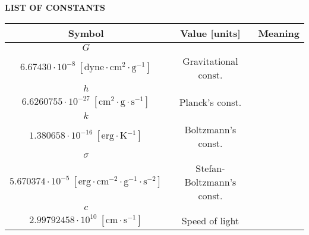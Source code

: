\newpage

{}
\noindent \Large \textbf{LIST OF CONSTANTS}
\normalsize

\vspace{10mm}
\begin{center}

\begingroup
\def\arraystretch{1.5}

\begin{tabularx}{\textwidth}{ccX}
\hline
\hline
\textbf{Symbol}	& \textbf{Value [units]} & \textbf{Meaning} \\
\hline
\hline
$G$	&
	\begin{tabular}{c}
        $6.67430 \cdot 10^{-11}\ [\si{\newton \cdot \meter^2 \cdot \kilogram^{-2}}]$ \\
         $6.67430 \cdot 10^{-8}\ [\si{\mathrm{dyne} \cdot \cm^2 \cdot \gram^{-1}}]$
	\end{tabular} 
	& Gravitational const. \\

$h$ &
	\begin{tabular}{c}
        $6.6260755 \cdot 10^{-34}\ [\si{\meter^2 \cdot \kilogram \cdot \second^{-1}}] $ \\
         $6.6260755 \cdot 10^{-27}\ [\si{\cm^2 \cdot \gram \cdot \second^{-1}}]$
	\end{tabular} 
	& Planck's const. \\
	
$k$ &
	\begin{tabular}{c}
        $1.380658 \cdot 10^{-23}\ [\si{\meter^2 \cdot \kilogram \cdot \second^{-2} \cdot \kelvin^{-1}}]$ \\
        $1.380658 \cdot 10^{-16}\ [\si{\mathrm{erg} \cdot \kelvin^{-1}}]$
	\end{tabular} 
	& Boltzmann's const. \\
	
$\sigma$ &
	\begin{tabular}{c}
        $5.670374 \cdot 10^{-8}\ [\si{\watt \cdot \meter^{-2} \cdot \kelvin^{-4}}] $ \\
        $5.670374 \cdot 10^{-5}\ [\si{\mathrm{erg} \cdot \cm^{-2} \cdot \gram^{-1} \cdot \second^{-2}}]$
	\end{tabular} 
	& Stefan-Boltzmann's const. \\

$c$ &
	\begin{tabular}{c}
        $2.99792458 \cdot 10^{8}\ [\si{\meter \cdot \second^{-1}}]$ \\
         $2.99792458 \cdot 10^{10}\ [\si{\cm \cdot \second^{-1}}]$
	\end{tabular} 
	& Speed of light \\
	

\end{tabularx}
\end{center}
